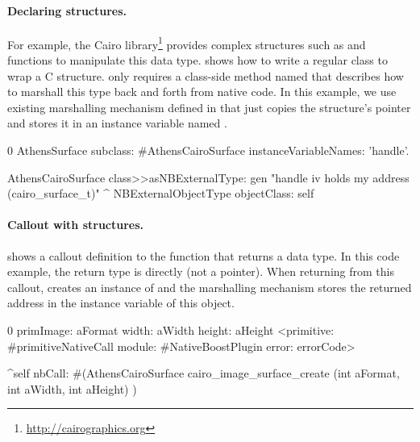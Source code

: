 \paragraph{Declaring structures.}
For example, the Cairo library\footnote{\url{http://cairographics.org}} provides complex structures such as  and functions to manipulate this data type. %
 shows how to write a regular \ST class to wrap a C structure.
\NB only requires a class-side method named  that describes how to marshall this type back and forth from native code.
In this example, we use existing marshalling mechanism defined in  that just copies the structure's pointer and stores it in an instance variable named .

\begin{stcode}[
	label={lst:ffi-AthensCairoSurface},
	caption={Example of C structure wrapping in \NB}]{0}
AthensSurface subclass: #AthensCairoSurface
	instanceVariableNames: 'handle'.

AthensCairoSurface class>>asNBExternalType: gen
	"handle iv holds my address (cairo_surface_t)"
	^ NBExternalObjectType objectClass: self
\end{stcode}

\paragraph{Callout with structures.}
 shows a callout definition to the  function that returns a  data type.
In this code example, the return type is  directly (not a pointer).
When returning from this callout, \NB creates an instance of  and the marshalling mechanism  stores the returned address in the  instance variable of this object.

\begin{stcode}[
	label={lst:ffi-calloutOpaqueStruct},
	caption={Example of returning a structure by reference}]{0}
primImage: aFormat width: aWidth height: aHeight
	<primitive: #primitiveNativeCall
	 module: #NativeBoostPlugin
     error: errorCode>

	^self nbCall: #(AthensCairoSurface
		cairo_image_surface_create (int aFormat,
									int aWidth,
									int aHeight) )
\end{stcode}

